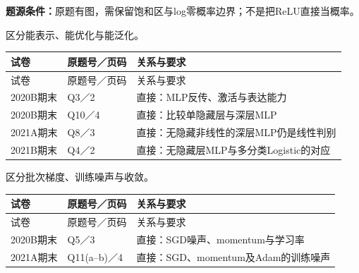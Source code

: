 \textbf{题源条件：}原题有图，需保留饱和区与log零概率边界；不是把ReLU直接当概率。



区分能表示、能优化与能泛化。

\begingroup\small\setlength{\tabcolsep}{3pt}\renewcommand{\arraystretch}{1.22}
\begin{longtable}{@{}>{\raggedright\arraybackslash}p{}>{\raggedright\arraybackslash}p{}>{\raggedright\arraybackslash}p{}@{}}
\toprule
试卷 & 原题号／页码 & 关系与要求 \\
\midrule\endfirsthead
试卷 & 原题号／页码 & 关系与要求 \\
\midrule\endhead
\bottomrule\endfoot
2020B期末 & Q3／2 & 直接：MLP反传、激活与表达能力 \\
2020B期末 & Q10／4 & 直接：比较单隐藏层与深层MLP \\
2021A期末 & Q8／3 & 直接：无隐藏非线性的深层MLP仍是线性判别 \\
2021B期末 & Q4／2 & 直接：无隐藏层MLP与多分类Logistic的对应 \\
\end{longtable}\endgroup



区分批次梯度、训练噪声与收敛。

\begingroup\small\setlength{\tabcolsep}{3pt}\renewcommand{\arraystretch}{1.22}
\begin{longtable}{@{}>{\raggedright\arraybackslash}p{}>{\raggedright\arraybackslash}p{}>{\raggedright\arraybackslash}p{}@{}}
\toprule
试卷 & 原题号／页码 & 关系与要求 \\
\midrule\endfirsthead
试卷 & 原题号／页码 & 关系与要求 \\
\midrule\endhead
\bottomrule\endfoot
2020B期末 & Q5／3 & 直接：SGD噪声、momentum与学习率 \\
2021A期末 & Q11(a–b)／4 & 直接：SGD、momentum及Adam的训练噪声 \\
\end{longtable}\endgroup

